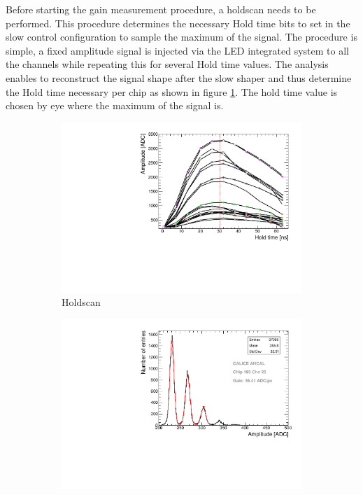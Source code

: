 Before starting the gain measurement procedure, a holdscan needs to be performed. This procedure determines the necessary Hold time bits to set in the slow control configuration to sample the maximum of the signal. The procedure is simple, a fixed amplitude signal is injected via the LED integrated system to all the channels while repeating this for several Hold time values. The analysis enables to reconstruct the signal shape after the slow shaper and thus determine the Hold time necessary per chip as shown in figure \ref{fig:Holdscan}. The hold time value is chosen by eye where the maximum of the signal is.

\begin{figure}[htbp!]
  \centering
  \begin{subfigure}[t]{0.49\textwidth}
    \includegraphics[width=1.\linewidth]{../Thesis_Plots/Commissioning/Plots/Holdscan_HBU2_15.pdf}
    \caption{Holdscan} \label{fig:Holdscan}
  \end{subfigure}
  \hfill
  \begin{subfigure}[t]{0.49\textwidth}
    \includegraphics[width=1.\linewidth]{../Thesis_Plots/Commissioning/Plots/Gain100fF_MainzHBU4.pdf}

\end{subfigure}
\end{figure}
